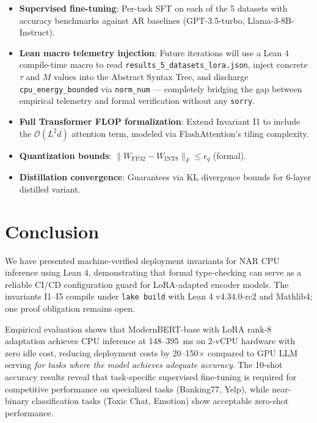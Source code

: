 \documentclass[10pt,journal,compsoc]{IEEEtran}
\theoremstyle{remark}
\begin{document}
\begin{itemize}
\item \textbf{Supervised fine-tuning}: Per-task SFT on each of the 5 datasets with accuracy benchmarks against AR baselines (GPT-3.5-turbo, Llama-3-8B-Instruct).
\item \textbf{Lean macro telemetry injection}: Future iterations will use a Lean 4 compile-time macro to read \texttt{results\_5\_datasets\_lora.json}, inject concrete $\tau$ and $M$ values into the Abstract Syntax Tree, and discharge \texttt{cpu\_energy\_bounded} via \texttt{norm\_num} --- completely bridging the gap between empirical telemetry and formal verification without any \texttt{sorry}.
\item \textbf{Full Transformer FLOP formalization}: Extend Invariant I1 to include the $\mathcal{O}(L^2 d)$ attention term, modeled via FlashAttention's tiling complexity.
\item \textbf{Quantization bounds}: $\|W_\text{FP32} - W_\text{INT8}\|_F \leq \epsilon_q$ (formal).
\item \textbf{Distillation convergence}: Guarantees via KL divergence bounds for 6-layer distilled variant.
\end{itemize}


\section{Conclusion}

We have presented machine-verified deployment invariants for NAR CPU inference using Lean 4, demonstrating that formal type-checking can serve as a reliable CI/CD configuration guard for LoRA-adapted encoder models. The invariants I1--I5 compile under \texttt{lake build} with Lean 4 v4.34.0-rc2 and Mathlib4; one proof obligation remains open.

Empirical evaluation shows that ModernBERT-base with LoRA rank-8 adaptation achieves CPU inference at 148--395~ms on 2-vCPU hardware with zero idle cost, reducing deployment costs by 20--150$\times$ compared to GPU LLM serving \emph{for tasks where the model achieves adequate accuracy}. The 10-shot accuracy results reveal that task-specific supervised fine-tuning is required for competitive performance on specialized tasks (Banking77, Yelp), while near-binary classification tasks (Toxic Chat, Emotion) show acceptable zero-shot performance.
\end{document}
